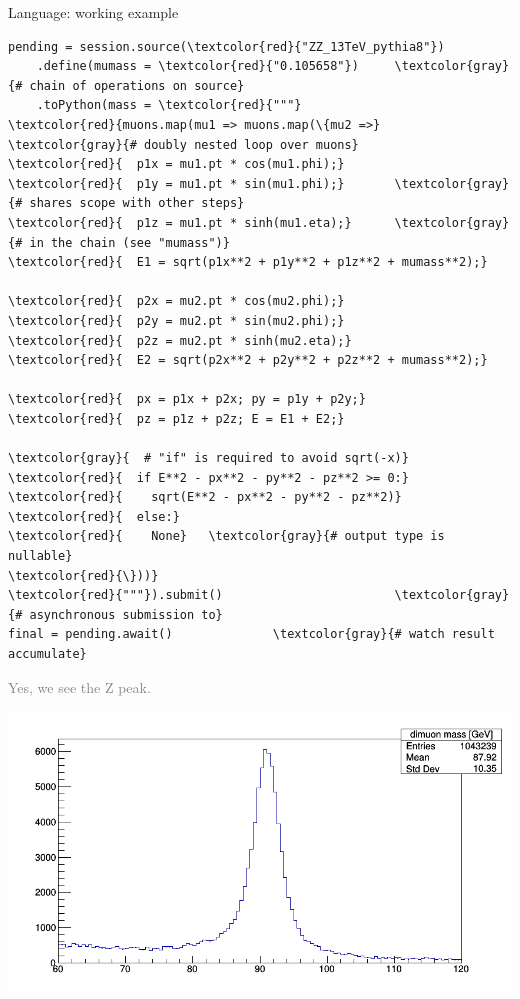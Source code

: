 \documentclass{beamer}
\begin{document}
\begin{frame}[fragile]{Language: working example}
\vspace{0.15 cm}
\scriptsize
\begin{Verbatim}[commandchars=\\\{\}]
pending = session.source(\textcolor{red}{"ZZ_13TeV_pythia8"})
    .define(mumass = \textcolor{red}{"0.105658"})     \textcolor{gray}{# chain of operations on source}
    .toPython(mass = \textcolor{red}{"""}
\textcolor{red}{muons.map(mu1 => muons.map(\{mu2 =>}   \textcolor{gray}{# doubly nested loop over muons}
\textcolor{red}{  p1x = mu1.pt * cos(mu1.phi);}
\textcolor{red}{  p1y = mu1.pt * sin(mu1.phi);}       \textcolor{gray}{# shares scope with other steps}
\textcolor{red}{  p1z = mu1.pt * sinh(mu1.eta);}      \textcolor{gray}{# in the chain (see "mumass")}
\textcolor{red}{  E1 = sqrt(p1x**2 + p1y**2 + p1z**2 + mumass**2);}

\textcolor{red}{  p2x = mu2.pt * cos(mu2.phi);}
\textcolor{red}{  p2y = mu2.pt * sin(mu2.phi);}
\textcolor{red}{  p2z = mu2.pt * sinh(mu2.eta);}
\textcolor{red}{  E2 = sqrt(p2x**2 + p2y**2 + p2z**2 + mumass**2);}

\textcolor{red}{  px = p1x + p2x; py = p1y + p2y;}
\textcolor{red}{  pz = p1z + p2z; E = E1 + E2;}

\textcolor{gray}{  # "if" is required to avoid sqrt(-x)}
\textcolor{red}{  if E**2 - px**2 - py**2 - pz**2 >= 0:}
\textcolor{red}{    sqrt(E**2 - px**2 - py**2 - pz**2)}
\textcolor{red}{  else:}
\textcolor{red}{    None}   \textcolor{gray}{# output type is nullable}
\textcolor{red}{\}))}
\textcolor{red}{"""}).submit()                        \textcolor{gray}{# asynchronous submission to}
final = pending.await()              \textcolor{gray}{# watch result accumulate}
\end{Verbatim}

\vspace{-4 cm}
\hfill \textcolor{gray}{Yes, we see the Z peak.\hspace{0.25 cm}}

\vspace{-0.2 cm}
\hfill \mbox{\includegraphics[width=0.48\linewidth]{c1.png}\hspace{-1 cm}}
\vspace{4 cm}
\end{frame}
\end{document}
